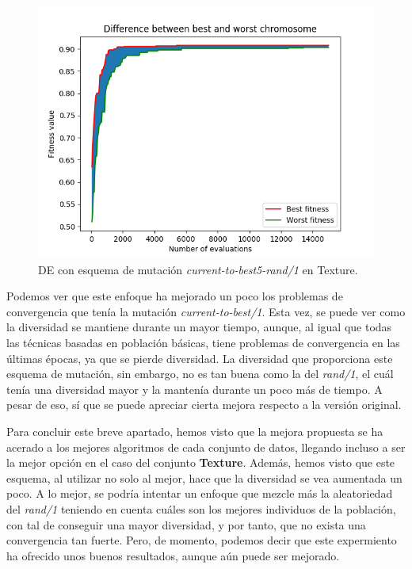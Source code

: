 \documentclass[11pt,a4paper]{article}
\begin{document}
\begin{figure}[H]
	\centering
	\includegraphics[scale=0.5]{img/texture-de-randbest.png}
	\caption{DE con esquema de mutación \textit{current-to-best5-rand/1} en Texture.}
\end{figure}

Podemos ver que este enfoque ha mejorado un poco los problemas de convergencia que tenía la mutación \textit{current-to-best/1}.
Esta vez, se puede ver como la diversidad se mantiene durante un mayor tiempo, aunque, al igual que todas las técnicas basadas
en población básicas, tiene problemas de convergencia en las últimas épocas, ya que se pierde diversidad. La diversidad que
proporciona este esquema de mutación, sin embargo, no es tan buena como la del \textit{rand/1}, el cuál tenía una diversidad mayor
y la mantenía durante un poco más de tiempo. A pesar de eso, sí que se puede apreciar cierta mejora respecto a la versión original.

Para concluir este breve apartado, hemos visto que la mejora propuesta se ha acerado a los mejores algoritmos de cada conjunto
de datos, llegando incluso a ser la mejor opción en el caso del conjunto \textbf{Texture}. Además, hemos visto que este esquema,
al utilizar no solo al mejor, hace que la diversidad se vea aumentada un poco. A lo mejor, se podría intentar un enfoque que mezcle
más la aleatoriedad del \textit{rand/1} teniendo en cuenta cuáles son los mejores individuos de la población, con tal de conseguir
una mayor diversidad, y por tanto, que no exista una convergencia tan fuerte. Pero, de momento, podemos decir que este expermiento
ha ofrecido unos buenos resultados, aunque aún puede ser mejorado.
\end{document}
